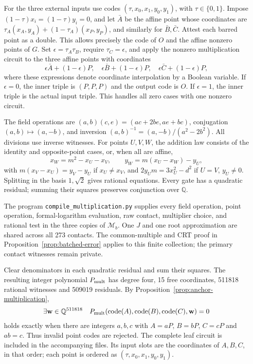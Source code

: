 \documentclass[11pt]{article}
\theoremstyle{definition}
\newcommand{\Q}{\mathbb Q}\newcommand{\Z}{\mathbb Z}
\newcommand{\code}{\operatorname{code}}
\begin{document}
For the three external inputs use codes
\((\tau,x_0,x_1,y_0,y_1)\), with \(\tau\in\{0,1\}\).
Impose \((1-\tau)x_i=(1-\tau)y_i=0\), and let
\(\bar A\) be the affine point whose coordinates are
\(\tau_A(x_A,y_A)+(1-\tau_A)(x_P,y_P)\), and similarly for
\(\bar B,\bar C\). Attest each barred point as a double. This
allows precisely the code of \(O\) and the affine nonzero points
of \(G\). Set \(\epsilon=\tau_A\tau_B\), require \(\tau_C=\epsilon\), and apply the nonzero multiplication circuit to the three affine points
with coordinates
\[
 \epsilon\bar A+(1-\epsilon)P,\quad
 \epsilon\bar B+(1-\epsilon)P,\quad
 \epsilon\bar C+(1-\epsilon)P,
\]
where these expressions denote coordinate interpolation by a Boolean
variable. If \(\epsilon=0\), the inner triple is \((P,P,P)\)
and the output code is \(O\). If \(\epsilon=1\), the inner
triple is the actual input triple. This handles all zero cases with one nonzero circuit.


The field operations are
\((a,b)(c,e)=(ac+2be,ae+bc)\), conjugation \((a,b)\mapsto(a,-b)\),
and inversion \((a,b)^{-1}=(a,-b)/(a^2-2b^2)\).
All divisions use inverse witnesses. For points \(U,V,W\),
the addition law consists of the identity and opposite-point cases,
or, when all are affine,
\[
 x_W=m^2-x_U-x_V,\qquad y_W=m(x_U-x_W)-y_U,
\]
with \(m(x_V-x_U)=y_V-y_U\) if \(x_U\ne x_V\), and
\(2y_Um=3x_U^2-d^2\) if \(U=V\), \(y_U\ne0\).
Splitting in the basis \(1,\sqrt2\) gives rational equations.
Every gate has a quadratic residual; summing their squares preserves
conjunction over \(\Q\).

The program \texttt{compile\_multiplication.py} supplies every field
operation, point operation, formal-logarithm evaluation, raw contact,
multiplier choice, and rational test in the three copies of
\(\mathcal M_b\).  One \(J\) and one root approximation are shared
across all 273 contacts. The common-multiple and CRT proof in
Proposition~\ref{prop:batched-error} applies to this finite collection;
the primary contact witnesses remain private.

Clear denominators in each quadratic residual and sum their squares.
The resulting integer polynomial \(P_{\rm mult}\) has degree four,
15 free coordinates, 511818 rational witnesses and 509019 residuals.
By Proposition~\ref{prop:anchor-multiplication},
\[
 \exists\mathbf w\in\Q^{511818}\quad
 P_{\rm mult}(\code(A),\code(B),\code(C),\mathbf w)=0
\]
holds exactly when there are integers \(a,b,c\) with
\(A=aP\), \(B=bP\), \(C=cP\) and \(ab=c\).
Thus invalid point codes are rejected.
The complete leaf circuit is included in the accompanying files.
Its input slots are the coordinates of \(A,B,C\), in that order;
each point is ordered as \((\tau,x_0,x_1,y_0,y_1)\).
\end{document}
